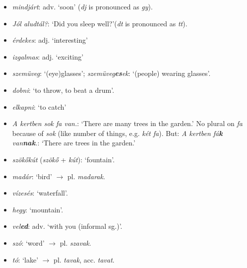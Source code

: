 \documentclass[a4paper,11pt]{article}
\begin{document}
\begin{itemize}
\begin{itemize}
      \item Suffixes \emph{-hoz/-höz/-hez} whenever \emph{-nál/-nél}
        would apply to the question \emph{Hol?}

    \end{itemize}

  \item \emph{mindjárt}: adv. `soon' (\emph{dj} is pronounced as
    \emph{gy}).

  \item \emph{Jól aludtál?}: `Did you sleep well?'(\emph{dt} is
    pronounced as \emph{tt}).

  \item \emph{érdekes}: adj. `interesting'

  \item \emph{izgalmas}: adj. `exciting'

  \item \emph{szemüveg}: `(eye)glasses'; \emph{szemüveg\textbf{es}ek}:
    `(people) wearing glasses'.

  \item \emph{dobni}: `to throw, to beat a drum'.

  \item \emph{elkapni}: `to catch'

  \item \emph{A kertben sok fa van.}: `There are many trees in the
    garden.' No plural on \emph{fa} because of \emph{sok} (like number
    of things, e.g. \emph{két fa}). But: \emph{A kertben fá\textbf{k}
    van\textbf{nak}.}: `There are trees in the garden.'

  \item \emph{szökőkút} (\emph{szökő} + \emph{kút}): `fountain'.

  \item \emph{madár}: `bird' $\rightarrow$ pl. \emph{madarak}.

  \item \emph{vízesés}: `waterfall'.

  \item \emph{hegy}: `mountain'.

  \item \emph{vel\textbf{ed}}: adv. `with you (informal sg.)'.

  \item \emph{szó}: `word' $\rightarrow$ pl. \emph{szavak}.

  \item \emph{tó}: `lake' $\rightarrow$ pl. \emph{tavak},
    acc. \emph{tavat}.


\end{itemize}
\end{document}
